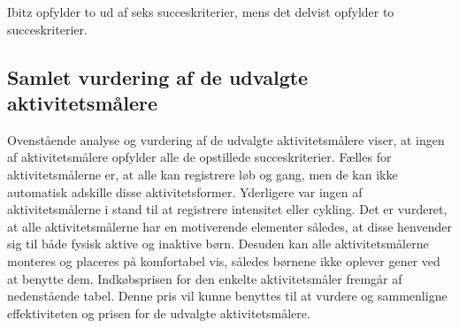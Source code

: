 Ibitz opfylder to ud af seks succeskriterier, mens det delvist opfylder to succeskriterier.

\subsection{Samlet vurdering af de udvalgte aktivitetsmålere}
Ovenstående analyse og vurdering af de udvalgte aktivitetsmålere viser, at ingen af aktivitetsmålere opfylder alle de opstillede succeskriterier. \newline
Fælles for aktivitetsmålerne er, at alle kan registrere løb og gang, men de kan ikke automatisk adskille disse aktivitetsformer. Yderligere var ingen af aktivitetsmålerne i stand til at registrere intensitet eller cykling. Det er vurderet, at alle aktivitetsmålerne har en motiverende elementer således, at disse henvender sig til både fysisk aktive og inaktive børn. Desuden kan alle aktivitetsmålerne monteres og placeres på komfortabel vis, således børnene ikke oplever gener ved at benytte dem. Indkøbsprisen for den enkelte aktivitetsmåler fremgår af nedenstående tabel. Denne pris vil kunne benyttes til at vurdere og sammenligne effektiviteten og prisen for de udvalgte aktivitetsmålere.  


